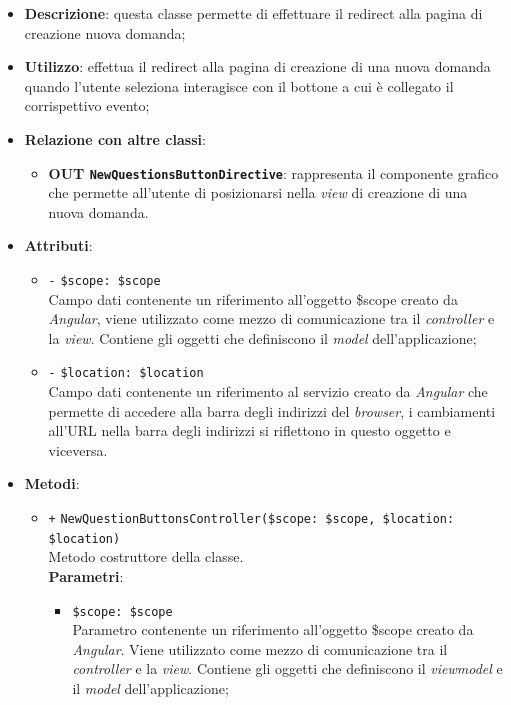 \begin{itemize}
	\item \textbf{Descrizione}: questa classe permette di effettuare il redirect alla pagina di creazione nuova domanda;
	\item \textbf{Utilizzo}: effettua il redirect alla pagina di creazione di una nuova domanda quando l'utente seleziona interagisce con il bottone a cui è collegato il corrispettivo evento;
	\item \textbf{Relazione con altre classi}:
	\begin{itemize}
		\item \textbf{OUT \texttt{NewQuestionsButtonDirective}}: rappresenta il componente grafico che permette all'utente di posizionarsi nella \textit{view} di creazione di una nuova domanda.
	\end{itemize}
	\item \textbf{Attributi}:
	\begin{itemize}
		\item \texttt{-} \texttt{\$scope: \$scope} \\
		Campo dati contenente un riferimento all'oggetto \$scope creato da \textit{Angular}, viene utilizzato come mezzo di comunicazione tra il \textit{controller} e la \textit{view}. Contiene gli oggetti che definiscono il \textit{model} dell'applicazione;
		\item \texttt{-} \texttt{\$location: \$location} \\
		Campo dati contenente un riferimento al servizio creato da \textit{Angular} che permette di accedere alla barra degli indirizzi del \textit{browser}, i cambiamenti all'URL nella barra degli indirizzi si riflettono in questo oggetto e viceversa.
	\end{itemize}
	\item \textbf{Metodi}:
	\begin{itemize}
		\item \texttt{+} \texttt{NewQuestionButtonsController(\$scope: \$scope, \$location: \$location)} \\ 
		Metodo costruttore della classe. \\
		\textbf{Parametri}:
		\begin{itemize}
			\item \texttt{\$scope: \$scope} \\
			Parametro contenente un riferimento all'oggetto \$scope creato da \textit{Angular}. Viene utilizzato come mezzo di comunicazione tra il \textit{controller} e la \textit{view}. Contiene gli oggetti che definiscono il \textit{viewmodel} e il \textit{model} dell'applicazione;

\end{itemize}
\end{itemize}
\end{itemize}
